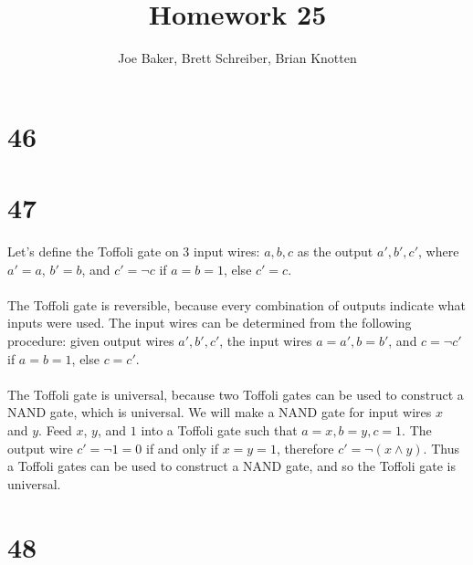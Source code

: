 \documentclass[letterpaper,notitlepage,twoside]{article}
\begin{document}
\title{Homework 25}
\author{Joe Baker, Brett Schreiber, Brian Knotten}
\maketitle
\section*{46}

\section*{47}
Let's define the Toffoli gate on 3 input wires: $a, b, c$  as the output $a', b', c'$, where $a' = a$, $b' = b$, and $c' = \neg c$ if $a = b = 1$, else $c' = c$. \\\\
The Toffoli gate is reversible, because every combination of outputs indicate what inputs were used. The input wires can be determined from the following procedure: given output wires $a', b', c'$, the input wires $a = a', b = b'$, and $c = \neg c'$ if $a = b = 1$, else $c = c'$. \\\\
The Toffoli gate is universal, because two Toffoli gates can be used to construct a NAND gate, which is universal. We will make a NAND gate for input wires $x$ and $y$. Feed $x$, $y$, and $1$ into a Toffoli gate such that $a = x, b = y, c = 1$. The output wire $c' = \neg 1 = 0$ if and only if $x = y = 1$, therefore $c' = \neg (x \land y)$. Thus a Toffoli gates can be used to construct a NAND gate, and so the Toffoli gate is universal.

\section*{48}
\end{document}
